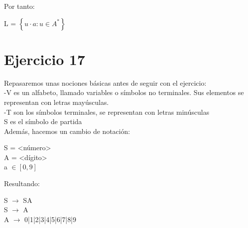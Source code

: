 Por tanto: 
\begin{center}
	
	L = $\left\lbrace u \cdot a: u \in A^* \right\rbrace$
\end{center}




\newpage
\section{Ejercicio 17}

Repasaremos unas nociones básicas antes de seguir con el ejercicio: \\

-V es un alfabeto, llamado variables o símbolos no terminales. Sus elementos se representan con letras mayúsculas. \\
-T son los símbolos terminales, se representan con letras minúsculas \\
S es el símbolo de partida \\

Además, hacemos un cambio de notación: \\
\begin{center}
	S = <número> \\
	A = <dígito> \\
	a $\in \left[0,9\right]$
\end{center}

Resultando: \\
\begin{center}
	S $\rightarrow$ SA \\
	S $\rightarrow$ A \\
	A $\rightarrow$ 0|1|2|3|4|5|6|7|8|9 \\
\end{center}

